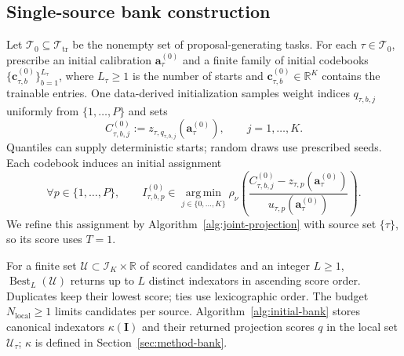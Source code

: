 \subsection{Single-source bank construction}
\label{app:initial-bank}

Let $\mathcal T_0\subseteq\mathcal T_{\mathrm{tr}}$ be the nonempty
set of proposal-generating tasks. For each $\tau\in\mathcal T_0$,
prescribe an initial
calibration $\mathbf a_\tau^{(0)}$ and a finite family of initial
codebooks $\{\mathbf c_{\tau,b}^{(0)}\}_{b=1}^{L_\tau}$, where
$L_\tau\ge1$ is the number of starts and
$\mathbf c_{\tau,b}^{(0)}\in\mathbb R^K$ contains the trainable
entries. One data-derived initialization samples weight indices
$q_{\tau,b,j}$ uniformly from $\{1,\ldots,P\}$ and sets
\begin{equation}
    C_{\tau,b,j}^{(0)}
        :=z_{\tau,q_{\tau,b,j}}(\mathbf a_\tau^{(0)}),
    \qquad j=1,\ldots,K.
    \label{eq:appendix-codebook-seeds}
\end{equation}
Quantiles can supply deterministic starts; random draws use prescribed
seeds. Each codebook induces an initial assignment
\begin{equation}
    \forall p\in\{1,\ldots,P\},\qquad
    I_{\tau,b,p}^{(0)}\in
        \operatorname*{arg\,min}_{j\in\{0,\ldots,K\}}
        \rho_\nu\!\left(
            \frac{C_{\tau,b,j}^{(0)}
                -z_{\tau,p}(\mathbf a_\tau^{(0)})}
                 {u_{\tau,p}(\mathbf a_\tau^{(0)})}\right).
    \label{eq:appendix-initial-assignment}
\end{equation}
We refine this assignment by Algorithm~\ref{alg:joint-projection}
with source set $\{\tau\}$, so its score uses $T=1$.

For a finite set $\mathcal U\subset\mathcal I_K\times\mathbb R$
of scored candidates and an integer $L\ge1$,
$\operatorname{Best}_L(\mathcal U)$ returns up to $L$ distinct
indexators in ascending score order. Duplicates keep their lowest
score; ties use lexicographic order. The budget
$N_{\mathrm{local}}\ge1$ limits candidates per source.
Algorithm~\ref{alg:initial-bank} stores canonical indexators
$\kappa(\mathbf I)$ and their returned projection scores $q$ in the
local set $\mathcal U_\tau$; $\kappa$ is defined in
Section~\ref{sec:method-bank}.

